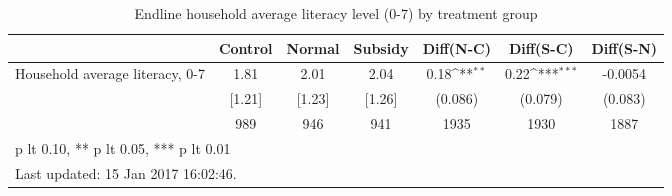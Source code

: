 \begin{table}[htbp]\centering
\def\sym#1{\ifmmode^{#1}\else\(^{#1}\)\fi}
\caption{Endline household average literacy level (0-7) by treatment group \label{tab:"balance"}}
\begin{tabular*}{1\hsize}{@{\hskip\tabcolsep\extracolsep\fill}l*{1}{cccccc}}
\toprule
                                &  Control&   Normal&  Subsidy&Diff(N-C)         &Diff(S-C)         &Diff(S-N)         \\
\midrule
Household average literacy, 0-7 &     1.81&     2.01&     2.04&     0.18\sym{**} &     0.22\sym{***}&  -0.0054         \\
                                &   [1.21]&   [1.23]&   [1.26]&  (0.086)         &  (0.079)         &  (0.083)         \\
                                &      989&      946&      941&     1935         &     1930         &     1887         \\
\bottomrule
\multicolumn{7}{l}{\footnotesize * p lt 0.10, ** p lt 0.05, *** p lt 0.01}\\
\multicolumn{7}{l}{\footnotesize Last updated: 15 Jan 2017 16:02:46.}\\
\end{tabular*}
\end{table}
